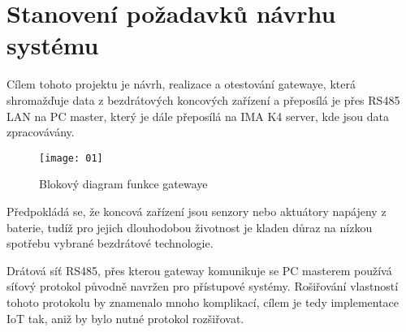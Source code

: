 \chapter{Stanovení požadavků návrhu systému}

Cílem tohoto projektu je návrh, realizace a otestování gatewaye, která shromažďuje data z bezdrátových koncových zařízení a přeposílá je přes RS485 LAN na PC master, který je dále přeposílá na IMA K4 server, kde jsou data zpracovávány.

\begin{figure}[!h]
    \centering
    \texttt{[image: 01]}
    \caption{Blokový diagram funkce gatewaye}
    \label{fig:block diagram of the system}
\end{figure}

Předpokládá se, že koncová zařízení jsou senzory nebo aktuátory napájeny z baterie, tudíž pro jejich dlouhodobou životnost je kladen důraz na nízkou spotřebu vybrané bezdrátové technologie.

Drátová síť RS485, přes kterou gateway komunikuje se PC masterem používá síťový protokol původně navržen pro přístupové systémy. 
Rošiřování vlastností tohoto protokolu by znamenalo mnoho komplikací, cílem je tedy implementace IoT tak, aniž by bylo nutné protokol rozšiřovat.

